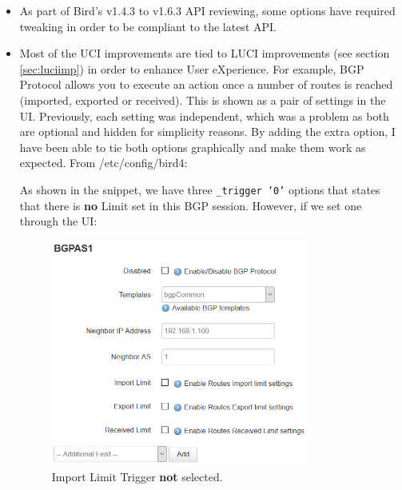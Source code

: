 \begin{itemize}
    \item As part of Bird's v1.4.3 to v1.6.3 API reviewing, some options have required tweaking in order to be compliant to the latest API.
    \item Most of the UCI improvements are tied to LUCI improvements (see section \ref{sec:luciimp}) in order to enhance User eXperience.
    For example, BGP Protocol allows you to execute an action once a number of routes is reached (imported, exported or received). This is shown as a pair of settings in the UI. Previously, each setting was independent, which was a problem as both are optional and hidden for simplicity reasons.
    By adding the extra option, I have been able to tie both options graphically and make them work as expected.
    From /etc/config/bird4:
    
    As shown in the snippet, we have three \texttt{\_trigger '0'} options that states that there is \textbf{no} Limit set in this BGP session. However, if we set one through the UI:
    \begin{figure}[H]
    \centering
    \includegraphics[width=0.8\textwidth]{images/bgp/bgptrigger1}
    \caption{Import Limit Trigger \textbf{not} selected.}
    \label{fig:uitiedn}
\end{figure}


\end{itemize}
